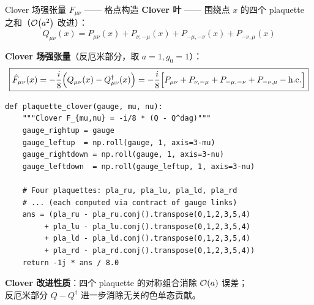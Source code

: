 \documentclass[10pt,aspectratio=169]{beamer}
\begin{document}
\begin{frame}[fragile]{Clover 场强张量 $F_{\mu\nu}$ —— 格点构造}
\small
\textbf{Clover 叶} —— 围绕点 $x$ 的四个 plaquette 之和（$\order{a^2}$ 改进）：
\begin{equation}
  Q_{\mu\nu}(x) = P_{\mu\nu}(x) + P_{\nu,-\mu}(x) + P_{-\mu,-\nu}(x) + P_{-\nu,\mu}(x)
\end{equation}

\textbf{Clover 场强张量}（反厄米部分，取 $a=1, g_0=1$）：
\begin{equation}
  \boxed{
  \hat{F}_{\mu\nu}(x) = -\frac{i}{8}\Bigl(Q_{\mu\nu}(x) - Q_{\mu\nu}^\dagger(x)\Bigr)
  = -\frac{i}{8}\Bigl[
  P_{\mu\nu} + P_{\nu,-\mu} + P_{-\mu,-\nu} + P_{-\nu,\mu} - \text{h.c.}
  \Bigr]
  }
\end{equation}

\begin{lstlisting}
def plaquette_clover(gauge, mu, nu):
    """Clover F_{mu,nu} = -i/8 * (Q - Q^dag)"""
    gauge_rightup = gauge
    gauge_leftup  = np.roll(gauge, 1, axis=3-mu)
    gauge_rightdown = np.roll(gauge, 1, axis=3-nu)
    gauge_leftdown  = np.roll(gauge_leftup, 1, axis=3-nu)

    # Four plaquettes: pla_ru, pla_lu, pla_ld, pla_rd
    # ... (each computed via contract of gauge links)
    ans = (pla_ru - pla_ru.conj().transpose(0,1,2,3,5,4)
         + pla_lu - pla_lu.conj().transpose(0,1,2,3,5,4)
         + pla_ld - pla_ld.conj().transpose(0,1,2,3,5,4)
         + pla_rd - pla_rd.conj().transpose(0,1,2,3,5,4))
    return -1j * ans / 8.0
\end{lstlisting}

\textbf{Clover 改进性质}：四个 plaquette 的对称组合消除 $\order{a}$ 误差；\\
反厄米部分 $Q-Q^\dagger$ 进一步消除无关的色单态贡献。
\end{frame}
\end{document}
